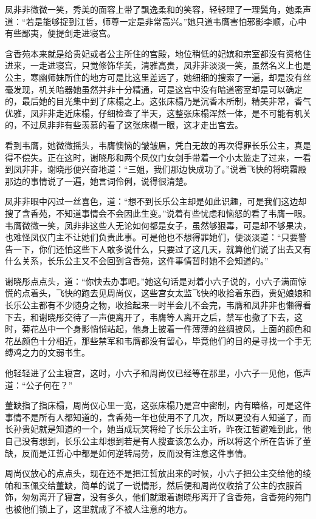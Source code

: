 凤非非微微一笑，秀美的面容上带了飘逸柔和的笑容，轻轻理了一理鬓角，她柔声道：“若是能够捉到江哲，师尊一定是非常高兴。”她只道韦膺害怕邪影李顺，心中有些鄙夷，便提剑走进寝宫。

含香苑本来就是给贵妃或者公主所住的宫殿，地位稍低的妃嫔和宗室都没有资格住进来，一走进寝宫，只觉修饰华美，清雅高贵，凤非非淡淡一笑，虽然名义上也是公主，寒幽师妹所住的地方可是比这里差远了，她细细的搜索了一遍，却是没有丝毫发现，机关暗器她虽然并非十分精通，可是这宫中没有暗道密室却是可以确定的，最后她的目光集中到了床榻之上。这张床榻乃是沉香木所制，精美非常，香气优雅，凤非非走近床榻，仔细检查了半天，这整张床榻浑然一体，是不可能有机关的，不过凤非非有些羡慕的看了这张床榻一眼，这才走出宫去。

看到韦膺，她微微摇头，韦膺懊恼的皱皱眉，凭白无故的再次得罪长乐公主，真是得不偿失。正在这时，谢晓彤和两个凤仪门女剑手带着一个小太监走了过来，一看到凤非非，谢晓彤便兴奋地道：“三姐，我们那边快成功了。”说着飞快的将晓霜殿那边的事情说了一遍，她言词伶俐，说得很清楚。

凤非非眼中闪过一丝喜色，道：“想不到长乐公主却是如此识趣，可是我们这边却搜了含香苑，不知道事情会不会因此生变。”说着有些忧虑和恼怒的看了韦膺一眼。韦膺微微一笑，凤非非这些人无论如何都是女子，虽然够狠毒，可是却不够果决，也难怪凤仪门主不让她们负责此事。可是他也不想得罪她们，便淡淡道：“只要警告一下，你们还怕这些下人敢多说什么，只要过了这几天，就算他们说了出去又有什么关系，长乐公主又不会回到含香苑，这件事情暂时她不会知道的。”

谢晓彤点点头，道：“你快去办事吧。”她这句话是对着小六子说的，小六子满面惊慌的点着头，飞快的跑去见周尚仪，这些宫女太监飞快的收拾着东西，贵妃娘娘和长乐公主都有不少随身之物，收拾起来一时半会儿不会完，韦膺和凤非非也懒得看下去，和谢晓彤交待了一声便离开了，韦膺等人离开之后，禁军也撤了下去，这时，菊花丛中一个身影悄悄站起，他身上披着一件薄薄的丝绸披风，上面的颜色和花丛颜色十分相近，那些禁军和韦膺都没有留心，毕竟他们的目的是寻找一个手无缚鸡之力的文弱书生。

他轻轻进了公主寝宫，这时，小六子和周尚仪已经等在那里，小六子一见他，低声道：“公子何在？”

董缺指了指床榻，周尚仪心里一宽，这张床榻乃是宫中密制，内有暗格，可是这件事情不是所有人都知道的，含香苑一年也使用不了几次，所以更没有人知道了，而长孙贵妃就是知道的一个，她当成玩笑将给了长乐公主听，昨夜江哲避难到此，他自己没有想到，长乐公主却想到若是有人搜查该怎么办，所以将这个所在告诉了董缺，反而是江哲心中都是如何逆转局势，反而没有注意这件事情。

周尚仪放心的点点头，现在还不是把江哲放出来的时候，小六子把公主交给他的绫帕和玉佩交给董缺，简单的说了一说情形，然后便和周尚仪收拾了公主的衣服首饰，匆匆离开了寝宫，没有多久，他们就跟着谢晓彤离开了含香苑，含香苑的苑门也被他们锁上了，这里就成了不被人注意的地方。

